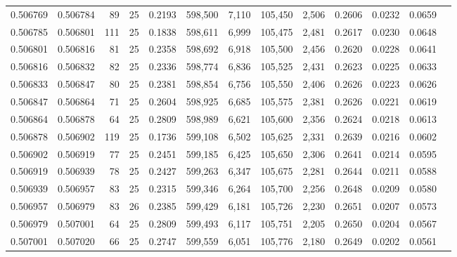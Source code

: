 \begin{tabular}{rrrrrrrrrrrrr}
0.506769 & 0.506784 &  89 &  25 &                                     0.2193 & 598,500 &   7,110 & 105,450 &   2,506 & 0.2606 & 0.0232 & 0.0659 \\
0.506785 & 0.506801 & 111 &  25 &                                     0.1838 & 598,611 &   6,999 & 105,475 &   2,481 & 0.2617 & 0.0230 & 0.0648 \\
0.506801 & 0.506816 &  81 &  25 &                                     0.2358 & 598,692 &   6,918 & 105,500 &   2,456 & 0.2620 & 0.0228 & 0.0641 \\
0.506816 & 0.506832 &  82 &  25 &                                     0.2336 & 598,774 &   6,836 & 105,525 &   2,431 & 0.2623 & 0.0225 & 0.0633 \\
0.506833 & 0.506847 &  80 &  25 &                                     0.2381 & 598,854 &   6,756 & 105,550 &   2,406 & 0.2626 & 0.0223 & 0.0626 \\
0.506847 & 0.506864 &  71 &  25 &                                     0.2604 & 598,925 &   6,685 & 105,575 &   2,381 & 0.2626 & 0.0221 & 0.0619 \\
0.506864 & 0.506878 &  64 &  25 &                                     0.2809 & 598,989 &   6,621 & 105,600 &   2,356 & 0.2624 & 0.0218 & 0.0613 \\
0.506878 & 0.506902 & 119 &  25 &                                     0.1736 & 599,108 &   6,502 & 105,625 &   2,331 & 0.2639 & 0.0216 & 0.0602 \\
0.506902 & 0.506919 &  77 &  25 &                                     0.2451 & 599,185 &   6,425 & 105,650 &   2,306 & 0.2641 & 0.0214 & 0.0595 \\
0.506919 & 0.506939 &  78 &  25 &                                     0.2427 & 599,263 &   6,347 & 105,675 &   2,281 & 0.2644 & 0.0211 & 0.0588 \\
0.506939 & 0.506957 &  83 &  25 &                                     0.2315 & 599,346 &   6,264 & 105,700 &   2,256 & 0.2648 & 0.0209 & 0.0580 \\
0.506957 & 0.506979 &  83 &  26 &                                     0.2385 & 599,429 &   6,181 & 105,726 &   2,230 & 0.2651 & 0.0207 & 0.0573 \\
0.506979 & 0.507001 &  64 &  25 &                                     0.2809 & 599,493 &   6,117 & 105,751 &   2,205 & 0.2650 & 0.0204 & 0.0567 \\
0.507001 & 0.507020 &  66 &  25 &                                     0.2747 & 599,559 &   6,051 & 105,776 &   2,180 & 0.2649 & 0.0202 & 0.0561 \\

\end{tabular}
